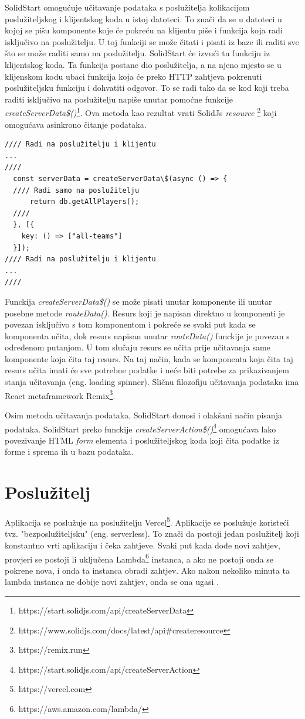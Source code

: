 \documentclass[times, utf8, zavrsni]{fer}
\begin{document}
SolidStart omogućuje učitavanje podataka s poslužitelja kolikacijom poslužiteljskog i klijentskog koda u istoj datoteci.
To znači da se u datoteci u kojoj se pišu komponente koje će pokreću na klijentu piše i funkcija koja radi isključivo na poslužitelju. U toj funkciji se može čitati i pisati iz baze ili raditi sve što se može raditi samo na poslužitelju.
SolidStart će izvući tu funkciju iz klijentskog koda. Ta funkcija postane dio poslužitelja, a na njeno mjesto se u klijenskom kodu ubaci funkcija koja će preko HTTP zahtjeva pokrenuti poslužiteljsku funkciju i dohvatiti odgovor.
To se radi tako da se kod koji treba raditi isključivo na poslužitelju napiše unutar pomoćne funkcije \emph{createServerData\$()}\footnote{https://start.solidjs.com/api/createServerData}.
Ova metoda kao rezultat vrati SolidJs \emph{resource} \footnote{https://www.solidjs.com/docs/latest/api\#createresource} koji omogućava asinkrono čitanje podataka.

\begin{lstlisting}[caption=Učitavanje podataka s poslužitelja]
//// Radi na poslužitelju i klijentu
...
////
  const serverData = createServerData\$(async () => {
  //// Radi samo na poslužitelju
      return db.getAllPlayers();
  ////
  }, [{
    key: () => ["all-teams"]
  }]);
//// Radi na poslužitelju i klijentu
...
////
\end{lstlisting}

Funckija \emph{createServerData\$()} se može pisati unutar komponente ili unutar posebne metode \emph{routeData()}.
Resurs koji je napisan direktno u komponenti je povezan isključivo s tom komponentom i pokreće se svaki put kada se komponenta učita, dok resurs napisan unutar \emph{routeData()} funckije je povezan s određenom putanjom.
U tom slučaju resurs se učita prije učitavanja same komponente koja čita taj resurs. Na taj način, kada se komponenta koja čita taj resurs učita imati će sve potrebne podatke i neće biti potrebe za prikazivanjem stanja učitavanja (eng. loading spinner).
Sličnu filozofiju učitavanja podataka ima React metaframework Remix\footnote{https://remix.run}.

Osim metoda učitavanja podataka, SolidStart donosi i olakšani način pisanja podataka.
SolidStart preko funckije \emph{createServerAction\$()}\footnote{https://start.solidjs.com/api/createServerAction} omogućava lako povezivanje HTML \emph{form} elementa i poslužiteljskog koda koji čita podatke iz forme i sprema ih u bazu podataka.

\section{Poslužitelj}
Aplikacija se poslužuje na poslužitelju Vercel\footnote{https://vercel.com}. Aplikacije se poslužuje koristeći tvz. "bezposlužiteljsku" (eng. serverless).
To znači da postoji jedan poslužitelj koji konstantno vrti aplikaciju i čeka zahtjeve. Svaki put kada dođe novi zahtjev, provjeri se postoji li uključena Lambda\footnote{https://aws.amazon.com/lambda/} instanca, a ako ne postoji onda se pokrene nova, i onda ta instanca obradi zahtjev.
Ako nakon nekoliko minuta ta lambda instanca ne dobije novi zahtjev, onda se ona ugasi \citep{serverless2022}.
\end{document}
